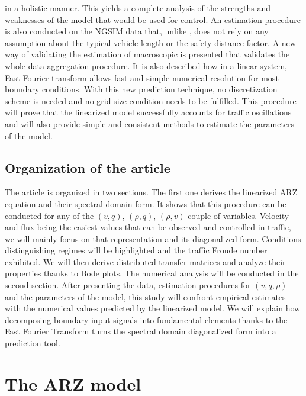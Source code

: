 \documentclass[preprint]{elsarticle}
\begin{document}
in a holistic manner. This yields a complete analysis of the strengths
and weaknesses of the model that would be used for control. An estimation
procedure is also conducted on the NGSIM data that, unlike \cite{Fan},
does not rely on any assumption about the typical vehicle length or
the safety distance factor. A new way of validating the estimation
of macroscopic is presented that validates the whole data aggregation
procedure. It is also described how in a linear system, Fast Fourier
transform allows fast and simple numerical resolution for most boundary
conditions. With this new prediction technique, no discretization
scheme is needed and no grid size condition needs to be fulfilled.
This procedure will prove that the linearized model successfully accounts
for traffic oscillations and will also provide simple and consistent
methods to estimate the parameters of the model.\

\subsection{Organization of the article}
The article is organized in two sections. The first one derives the
linearized ARZ equation and their spectral domain form. It shows that
this procedure can be conducted for any of the $\left(v,q\right)$,
$\left(\rho,q\right)$, $\left(\rho,v\right)$ couple of variables.
Velocity and flux being the easiest values that can be observed and
controlled in traffic, we will mainly focus on that representation
and its diagonalized form. Conditions distinguishing regimes will
be highlighted and the traffic Froude number exhibited. We will then
derive distributed transfer matrices and analyze their properties
thanks to Bode plots. The numerical analysis will be conducted in
the second section. After presenting the data, estimation procedures
for $\left(v,q,\rho\right)$ and the parameters of the model, this
study will confront empirical estimates with the numerical values
predicted by the linearized model. We will explain how decomposing
boundary input signals into fundamental elements thanks to the Fast
Fourier Transform turns the spectral domain diagonalized form into
a prediction tool.


\section{The ARZ model}

\end{document}
